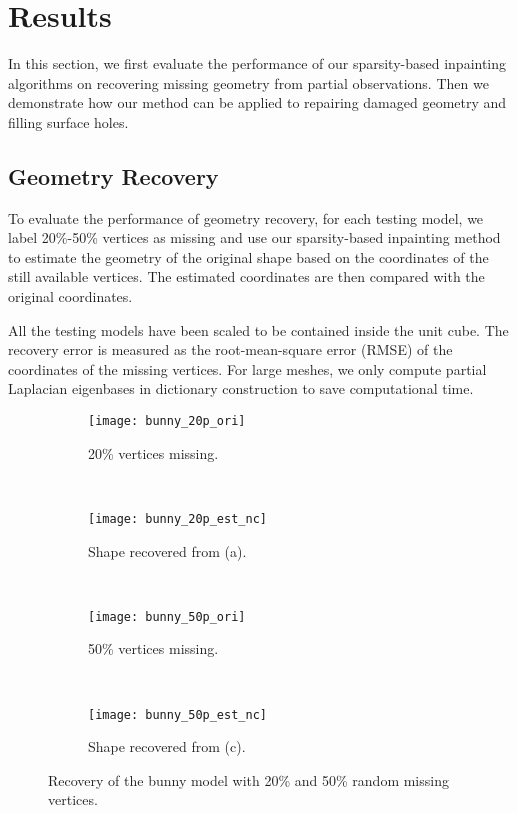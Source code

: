 \section{Results}
In this section, we first evaluate the performance of our sparsity-based inpainting
algorithms on recovering missing geometry from partial observations. Then we demonstrate
how our method can be applied to repairing damaged geometry and filling surface holes.

\subsection{Geometry Recovery}
To evaluate the performance of geometry recovery, for each testing model, we
label 20\%-50\% vertices as missing and use our sparsity-based inpainting method to
estimate the geometry of the original shape based on the coordinates of the
still available vertices. The estimated coordinates are then
compared with the original coordinates.

All the testing models have been scaled to be contained inside the unit cube.
The recovery error is measured as the root-mean-square error (RMSE) of the coordinates
of the missing vertices. For large meshes, we only compute partial Laplacian
eigenbases in dictionary construction to save computational time.

\begin{figure}
  \centering
    \begin{subfigure}[b]{0.23\linewidth}
        \texttt{[image: bunny\_20p\_ori]}
        \caption{20\% vertices missing.}
    \end{subfigure}
    ~
    \begin{subfigure}[b]{0.23\linewidth}
        \texttt{[image: bunny\_20p\_est\_nc]}
        \caption{Shape recovered from (a).}
    \end{subfigure}
    ~
    \begin{subfigure}[b]{0.23\linewidth}
        \texttt{[image: bunny\_50p\_ori]}
        \caption{50\% vertices missing.}
    \end{subfigure}
    ~
    \begin{subfigure}[b]{0.23\linewidth}
        \texttt{[image: bunny\_50p\_est\_nc]}
        \caption{Shape recovered from (c).}
    \end{subfigure}
\caption{Recovery of the bunny model with 20\% and 50\% random missing vertices.}
\label{fig:bunny:recovery}
\end{figure}

